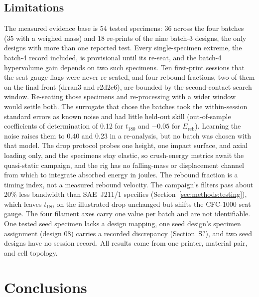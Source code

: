 \documentclass[11pt]{article}
\providecommand{\siref}[1]{S?}
\begin{document}
\subsection{Limitations}
The measured evidence base is 54 tested specimens: 36
across the four batches (35 with a weighed mass) and 18 re-prints of
the nine batch-3 designs, the only designs with more than one reported
test. Every single-specimen extreme, the batch-4 record included, is
provisional until its re-seat, and the batch-4 hypervolume gain depends
on two such specimens. Ten first-print sessions that the seat gauge
flags were never re-seated, and four rebound fractions, two of them on
the final front (drran3 and r2d2c6), are bounded by the second-contact
search window. Re-seating those specimens and re-processing with a
wider window would settle both. The surrogate
that chose the batches took the within-session standard errors as known
noise and had little held-out skill (out-of-sample coefficients of
determination of 0.12 for $t_{180}$ and $-0.05$ for $E_{\mathrm{reb}}$).
Learning the noise raises them to 0.40 and 0.23 in a re-analysis, but no
batch was chosen with that model. The drop protocol
probes one height, one impact surface, and axial loading only, and the
specimens stay elastic, so crush-energy metrics await the quasi-static
campaign, and the rig has no falling-mass or displacement channel from
which to integrate absorbed energy in joules. The rebound fraction is a
timing index, not a measured rebound velocity. The campaign's filters
pass about 20\% less bandwidth than SAE~J211/1 specifies
(Section~\ref{sec:methods:testing}), which leaves $t_{180}$ on the
illustrated drop unchanged but shifts the CFC-1000 seat gauge. The four
filament axes carry one value per batch and are not identifiable. One
tested seed specimen lacks a design mapping, one seed design's specimen
assignment (design 08) carries a recorded discrepancy
(Section~\siref{si:printkey}), and two seed designs have no
session record. All results come from one printer, material pair, and
cell topology.


\section{Conclusions}
\label{sec:conclusions}
\end{document}
